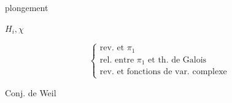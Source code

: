 

plongement

$H_i,\chi$

\[
\left\{\begin{array}{l}
\text{rev. et }\pi_1\\
\text{rel. entre }\pi_1\text{ et th. de Galois}\\
\text{rev. et fonctions de var. complexe}
\end{array}\right.
\]

Conj. de Weil

